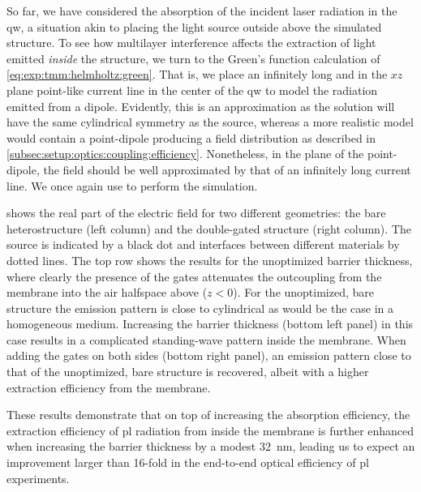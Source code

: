 So far, we have considered the absorption of the incident laser radiation in the \gls{qw}, a situation akin to placing the light source outside above the simulated structure.
To see how multilayer interference affects the extraction of light emitted \emph{inside} the structure, we turn to the Green's function calculation of \cref{eq:exp:tmm:helmholtz:green}.
That is, we place an infinitely long and in the $xz$ plane point-like current line in the center of the \gls{qw} to model the radiation emitted from a dipole.
Evidently, this is an approximation as the solution will have the same cylindrical symmetry as the source, whereas a more realistic model would contain a point-dipole producing a field distribution as described in \cref{subsec:setup:optics:coupling:efficiency}.
Nonetheless, in the plane of the point-dipole, the field should be well approximated by that of an infinitely long current line.
We once again use \pymoosh to perform the simulation.

 shows the real part of the electric field for two different geometries: the bare heterostructure (left column) and the double-gated structure (right column).
The source is indicated by a black dot and interfaces between different materials by dotted lines.
The top row shows the results for the unoptimized barrier thickness, where clearly the presence of the gates attenuates the outcoupling from the membrane into the air halfspace above ($z < 0$).
For the unoptimized, bare structure the emission pattern is close to cylindrical as would be the case in a homogeneous medium.
Increasing the barrier thickness (bottom left panel) in this case results in a complicated standing-wave pattern inside the membrane.
When adding the gates on both sides (bottom right panel), an emission pattern close to that of the unoptimized, bare structure is recovered, albeit with a higher extraction efficiency from the membrane.

These results demonstrate that on top of increasing the absorption efficiency, the extraction efficiency of \gls{pl} radiation from inside the membrane is further enhanced when increasing the  barrier thickness by a modest \qty{32}{\nano\meter}, leading us to expect an improvement larger than 16-fold in the end-to-end optical efficiency of \gls{pl} experiments.
